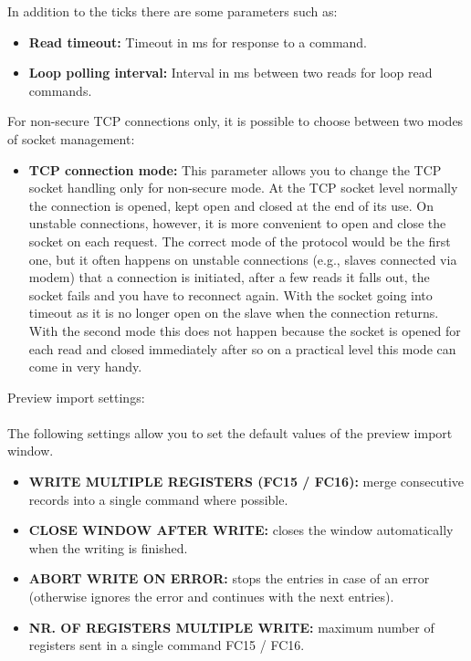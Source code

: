 In addition to the ticks there are some parameters such as:

\begin{itemize}
    \item \textbf{Read timeout:}
    Timeout in ms for response to a command.
    \item \textbf{Loop polling interval:}
    Interval in ms between two reads for loop read commands.
\end{itemize}

For non-secure TCP connections only, it is possible to choose between two modes
of socket management:

\begin{itemize}
    \item \textbf{TCP connection mode:}
    This parameter allows you to change the TCP socket handling only for 
    non-secure mode. At the TCP socket level normally the connection is opened,
    kept open and closed at the end of its use.
    On unstable connections, however, it is more convenient to open and 
    close the socket on each request.
    The correct mode of the protocol would be the first one,
    but it often happens 
    on unstable connections (e.g., slaves connected via modem) that a connection is initiated,
    after a few reads it falls out, the socket fails and you have to reconnect again.
    With the socket going into timeout as it is no longer open on the slave 
    when the connection returns. With the second
    mode this does not happen because the socket is opened for each read 
    and closed immediately after so on a practical level this mode can come in very handy.
\end{itemize}

Preview import settings:
\\\\
The following settings allow you to set the default values
of the preview import window.

\begin{itemize}
    \item \textbf{WRITE MULTIPLE REGISTERS (FC15 / FC16):} merge consecutive records into a single command where possible.
    \item \textbf{CLOSE WINDOW AFTER WRITE:} closes the window automatically when the writing is finished.
    \item \textbf{ABORT WRITE ON ERROR:} stops the entries in case of an error (otherwise ignores the error and continues with the next entries).
    \item \textbf{NR. OF REGISTERS MULTIPLE WRITE:} maximum number of registers sent in a single command FC15 / FC16.
\end{itemize}